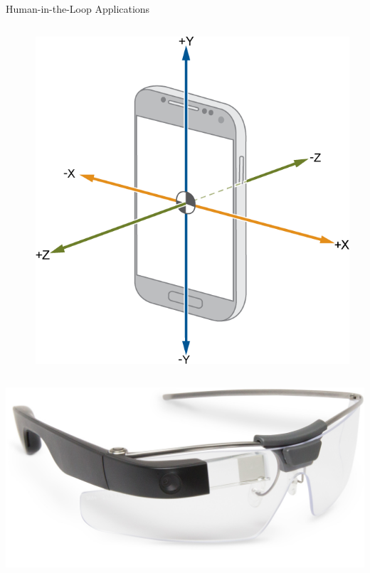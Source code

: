 \documentclass[aspectratio=1610]{beamer}
\begin{document}
\begin{frame}{Human-in-the-Loop Applications}
\begin{columns}[onlytextwidth]
\begin{column}{.1\linewidth}
        \end{column}%
        \begin{column}{.01\linewidth}
        \end{column}%
        \begin{column}{.1\linewidth}
            \centering%
            \includegraphics[width=\linewidth]{img/accel.png}
        \end{column}%
        \begin{column}{.335\linewidth}%
        \end{column}%
    \end{columns}%
    \begin{columns}[onlytextwidth]
        \begin{column}{.25\linewidth}
            \centering%
            \includegraphics[width=\linewidth]{img/glass_wearable.jpeg}\\

\end{column}
\end{columns}
\end{frame}
\end{document}
